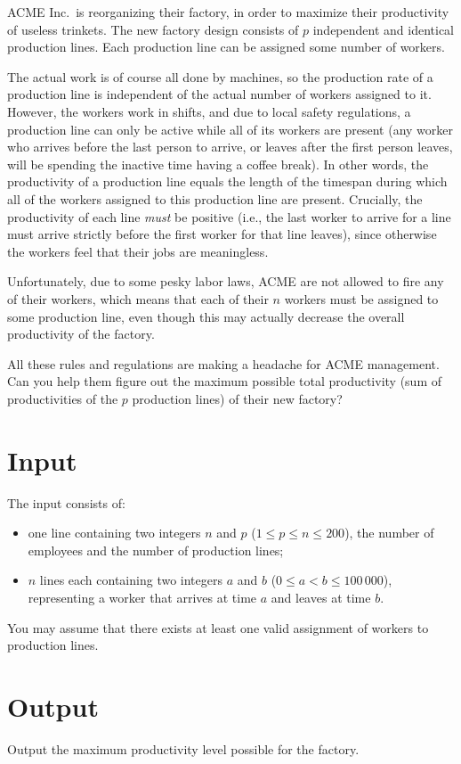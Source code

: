 
ACME Inc.~is reorganizing their factory, in order to maximize their
productivity of useless trinkets.  The new factory design consists of
$p$ independent and identical production lines.  Each production line
can be assigned some number of workers.

The actual work is of course all done by machines, so the production
rate of a production line is independent of the actual number of
workers assigned to it.  However, the workers work in shifts, and due
to local safety regulations, a production line can only be active
while all of its workers are present (any worker who arrives before
the last person to arrive, or leaves after the first person leaves,
will be spending the inactive time having a coffee break).  In other
words, the productivity of a production line equals the length of the
timespan during which all of the workers assigned to this production line are present.  Crucially, the
productivity of each line \emph{must} be positive (i.e., the last worker to arrive for a line must
arrive strictly before the first worker for that line leaves), since otherwise the
workers feel that their jobs are meaningless.

Unfortunately, due to some pesky labor laws, ACME are not allowed to
fire any of their workers, which means that each of their $n$ workers
must be assigned to some production line, even though this may
actually decrease the overall productivity of the factory.

All these rules and regulations are making a headache for ACME
management.  Can you help them figure out the maximum possible total
productivity (sum of productivities of the $p$ production lines) of
their new factory?

\section*{Input}

The input consists of:
\begin{itemize}
\item one line containing two integers $n$ and $p$ ($1 \le p \le n \le 200$), the number of employees and the number of production lines;
\item $n$ lines each containing two integers $a$ and $b$ ($0 \le a < b \le 100\,000$), representing a worker that arrives at time $a$ and leaves at time $b$.
\end{itemize}

You may assume that there exists at least one valid assignment of
workers to production lines.

\section*{Output}

Output the maximum productivity level possible for the
factory. 


